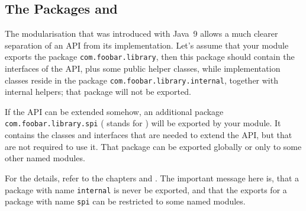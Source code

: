 
\subsection{The Packages  and }
The modularisation that was introduced with Java~9 \autocite{OPENJDK:ProjectJigsaw} allows a much clearer separation of an API from its implementation. Let's assume that your module exports the package \lstinline|com.foobar.library|, then this package should contain the interfaces of the API, plus some public helper classes, while implementation classes reside in the package \lstinline|com.foobar.library.internal|, together with internal helpers; that package will not be exported.

If the API can be extended somehow, an additional package \lstinline|com.foobar.library.spi| ( stands for ) will be exported by your module. It contains the classes and interfaces that are needed to extend the API, but that are not required to use it. That package can be exported globally or only to some other named modules.

For the details, refer to the chapters  and . The important message here is, that a package with name \lstinline|internal| is never be exported, and that the exports for a package with name \lstinline|spi| can be restricted to some named modules.


